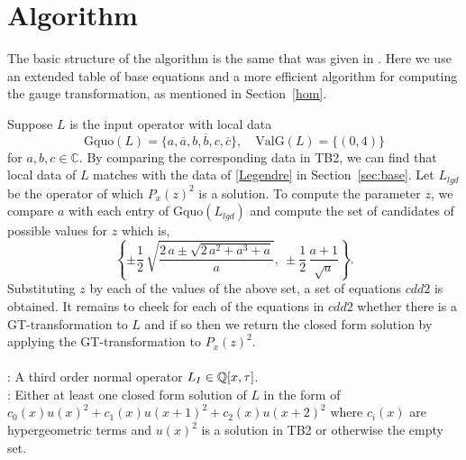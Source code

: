 \documentclass{article}
\newcommand{\C}{{\mathbb{C}}} \newcommand{\N}{{\mathbb{N}}}
\newcommand{\valg}{\mathrm{ValG}}
\newcommand{\Gq}{\mathrm{Gquo}}
\begin{document}
\section{Algorithm}\label{sec:algo}

The basic structure of the algorithm is the same that was given in \cite{YC11}. Here we use an extended table of base equations and a more efficient algorithm for computing
the gauge transformation, as mentioned in Section~\ref{hom}.

Suppose $L$ is the input operator with local data
$$ \Gq(L)=\{ a, \overline{a}, b, \overline{b}, c, \overline{c} \} , \quad \valg(L)=\{ (0,4)  \}$$
for $a, b, c \in \C$.
By comparing the corresponding data in TB2, we can find that local data of $L$ matches with the data of \eqref{Legendre} in Section~\ref{sec:base}.
Let $L_{lgd}$ be the operator of which $P_x(z)^2$ is a solution. To compute the parameter $z$, we compare $a$ with each entry of $\Gq(L_{lgd})$ 
and compute the set of candidates of possible values for $z$ which is, 
$$
\left\{ \pm\frac12\,\sqrt {{\frac {2\,a\pm\sqrt {2\,{a}^{2}+{a}^{3}+a}}{a}}}, \
\pm\frac12\,{\frac {a+1}{\sqrt {a}}} \right\}.
$$
Substituting $z$ by each of the values of the above set, a set of equations $cdd2$ is obtained. 
It remains to cheek for each of the equations in $cdd2$ whether there is a GT-transformation to $L$ and 
if so then we return the closed form solution by applying the GT-transformation to 
$P_x(z)^2$. 
\\

\\
: A third order normal operator $L_I \in {\mathbb{Q}}[x, \tau]$.\\
\noindent {\bf Output}: Either at least one closed form solution of $L$ in the form of $c_0(x)u(x)^2+c_1(x)u(x+1)^2+c_2(x)u(x+2)^2$ where 
$c_i(x)$ are hypergeometric terms and $u(x)^2$ is a solution in TB2 or otherwise the empty set.
\end{document}
